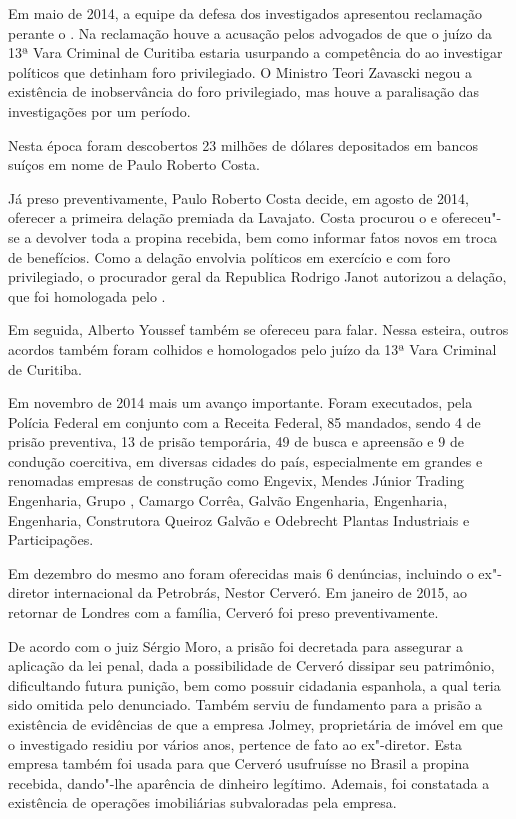 Em maio de 2014, a equipe da defesa dos investigados apresentou
reclamação perante o . Na reclamação houve a acusação pelos advogados
de que o juízo da 13ª Vara Criminal de Curitiba estaria usurpando a
competência do  ao investigar políticos que detinham foro
privilegiado. O Ministro Teori Zavascki negou a existência de
inobservância do foro privilegiado, mas houve a paralisação das
investigações por um período.

Nesta época foram descobertos 23 milhões de dólares depositados em
bancos suíços em nome de Paulo Roberto Costa.

Já preso preventivamente, Paulo Roberto Costa decide, em agosto de 2014,
oferecer a primeira delação premiada da Lavajato. Costa procurou o 
e ofereceu"-se a devolver toda a propina recebida, bem como informar
fatos novos em troca de benefícios. Como a delação envolvia políticos em
exercício e com foro privilegiado, o procurador geral da Republica
Rodrigo Janot autorizou a delação, que foi homologada pelo .

Em seguida, Alberto Youssef também se ofereceu para falar. Nessa
esteira, outros acordos também foram colhidos e homologados pelo juízo
da 13ª Vara Criminal de Curitiba.

Em novembro de 2014 mais um avanço importante. Foram executados, pela
Polícia Federal em conjunto com a Receita Federal, 85 mandados, sendo 4
de prisão preventiva, 13 de prisão temporária, 49 de busca e apreensão e
9 de condução coercitiva, em diversas cidades do país, especialmente em
grandes e renomadas empresas de construção como Engevix, Mendes Júnior
Trading Engenharia, Grupo , Camargo Corrêa, Galvão Engenharia, 
Engenharia,  Engenharia, Construtora Queiroz Galvão e Odebrecht
Plantas Industriais e Participações.

Em dezembro do mesmo ano foram oferecidas mais 6 denúncias, incluindo o
ex"-diretor internacional da Petrobrás, Nestor Cerveró. Em janeiro de
2015, ao retornar de Londres com a família, Cerveró foi preso
preventivamente.

De acordo com o juiz Sérgio Moro, a prisão foi decretada para assegurar
a aplicação da lei penal, dada a possibilidade de Cerveró dissipar seu
patrimônio, dificultando futura punição, bem como possuir cidadania
espanhola, a qual teria sido omitida pelo denunciado. Também serviu de
fundamento para a prisão a existência de evidências de que a empresa
Jolmey, proprietária de imóvel em que o investigado residiu por vários
anos, pertence de fato ao ex"-diretor. Esta empresa também foi usada para
que Cerveró usufruísse no Brasil a propina recebida, dando"-lhe aparência
de dinheiro legítimo. Ademais, foi constatada a existência de operações
imobiliárias subvaloradas pela empresa.

